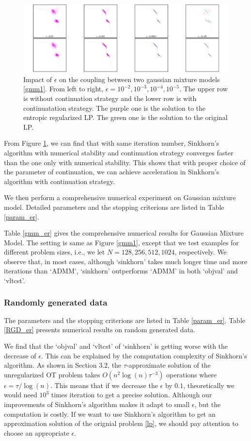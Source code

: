 \begin{figure}[!htb]
\centering
\includegraphics[width=12cm]{final/gmm4.jpg}
	\caption{Impact of $\epsilon$ on the coupling between two gaussian mixture models \ref{gmm1}. From left to right, $\epsilon=10^{-2},10^{-3},10^{-4},10^{-5}$. The upper row is without continuation strategy and the lower row is with continuatation strategy. The purple one is the solution to the entropic regularized LP. The green one is the solution to the original LP.}
\label{gmm4}
\end{figure}

From Figure \ref{gmm4}, we can find that with same iteration number, Sinkhorn's algorithm with numerical stability and continuation strategy converges faster than the one only with numerical stability. This shows that with proper choice of the parameter of continuation, we can achieve acceleration in Sinkhorn's algorithm with continuation strategy.

We then perform a comprehensive numerical experiment on Gaussian mixture model. Detailed parameters and the stopping criterions are listed in Table \ref{param_er}. 


Table \ref{gmm_er} gives the comprehensive numerical results for Gaussian Mixture Model. The setting is same as Figure \ref{gmm1}, except that we test examples for different problem sizes, i.e., we let $N=128, 256, 512, 1024$, respectively. We observe that, in most cases, although `sinkhorn' takes much longer time and more iterations than `ADMM', `sinkhorn' outperforms `ADMM' in both `objval' and `vltcst'. 

\subsubsection{Randomly generated data}
The parameters and the stopping criterions are listed in Table \ref{param_er}. Table \ref{RGD_er} presents numerical results on random generated data. 



We find that the `objval' and `vltcst' of `sinkhorn' is getting worse with the decrease of $\epsilon$. This can be explained by the computation complexity of Sinkhorn's algorithm. As shown in Section 3.2, the $\tau$-approximate solution of the unregularized OT problem takes $O(n^2\log(n)\tau^{-3})$ operations where $\epsilon=\tau/\log(n)$. This means that if we decrease the $\epsilon$ by $0.1$, theoretically we would need $10^3$ times iteration to get a precise solution. Although our improvements of Sinkhorn's algorithm makes it adapt to small $\epsilon$, but the computation is costly. If we want to use Sinkhorn's algorithm to get an approximation solution of the orignial problem \ref{lp}, we should pay attention to choose an appropriate $\epsilon$. 

